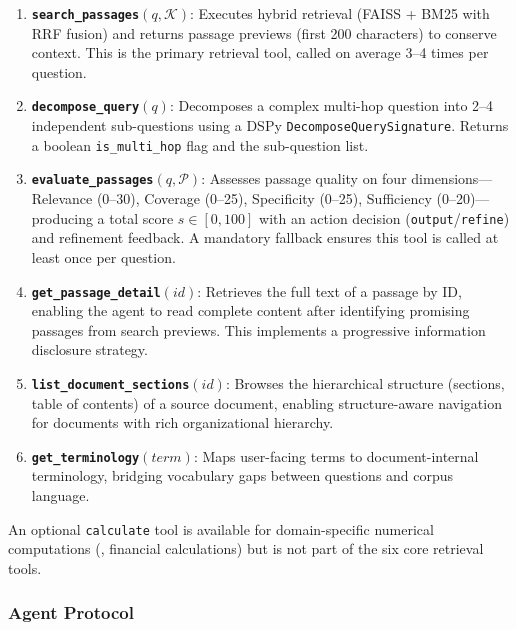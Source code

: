 \begin{enumerate}
    \item \textbf{\texttt{search\_passages}$(q, \mathcal{K})$}: Executes hybrid retrieval (FAISS + BM25 with RRF fusion) and returns passage previews (first 200 characters) to conserve context. This is the primary retrieval tool, called on average 3--4 times per question.

    \item \textbf{\texttt{decompose\_query}$(q)$}: Decomposes a complex multi-hop question into 2--4 independent sub-questions using a DSPy \texttt{DecomposeQuerySignature}. Returns a boolean \texttt{is\_multi\_hop} flag and the sub-question list.

    \item \textbf{\texttt{evaluate\_passages}$(q, \mathcal{P})$}: Assesses passage quality on four dimensions---Relevance (0--30), Coverage (0--25), Specificity (0--25), Sufficiency (0--20)---producing a total score $s \in [0, 100]$ with an action decision (\texttt{output}\slash\texttt{refine}) and refinement feedback. A mandatory fallback ensures this tool is called at least once per question.

    \item \textbf{\texttt{get\_passage\_detail}$(id)$}: Retrieves the full text of a passage by ID, enabling the agent to read complete content after identifying promising passages from search previews. This implements a progressive information disclosure strategy.

    \item \textbf{\texttt{list\_document\_sections}$(id)$}: Browses the hierarchical structure (sections, table of contents) of a source document, enabling structure-aware navigation for documents with rich organizational hierarchy.

    \item \textbf{\texttt{get\_terminology}$(term)$}: Maps user-facing terms to document-internal terminology, bridging vocabulary gaps between questions and corpus language.
\end{enumerate}

An optional \texttt{calculate} tool is available for domain-specific numerical computations (\eg, financial calculations) but is not part of the six core retrieval tools.

\subsubsection{Agent Protocol}
\label{subsubsec:protocol}


